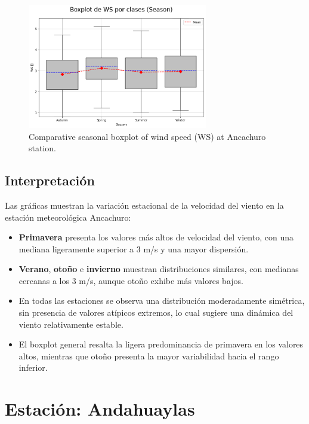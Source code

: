 \vspace{0.2cm}

\begin{figure}[htbp]
\centering
\includegraphics[width=0.7\textwidth]{resultados/por_estacion_del_anio/boxplot_clases_por_estacion/Ancachuro/WS_ClassBoxplot_Season.png}
\caption{Comparative seasonal boxplot of wind speed (WS) at Ancachuro station.}
\label{fig:ancachuro_ws_box}
\end{figure}

\subsection*{Interpretación}

Las gráficas muestran la variación estacional de la velocidad del viento en la estación meteorológica Ancachuro:

\begin{itemize}
    \item \textbf{Primavera} presenta los valores más altos de velocidad del viento, con una mediana ligeramente superior a 3 m/s y una mayor dispersión.
    \item \textbf{Verano}, \textbf{otoño} e \textbf{invierno} muestran distribuciones similares, con medianas cercanas a los 3 m/s, aunque otoño exhibe más valores bajos.
    \item En todas las estaciones se observa una distribución moderadamente simétrica, sin presencia de valores atípicos extremos, lo cual sugiere una dinámica del viento relativamente estable.
    \item El boxplot general resalta la ligera predominancia de primavera en los valores altos, mientras que otoño presenta la mayor variabilidad hacia el rango inferior.
\end{itemize}


\section{Estación: Andahuaylas}

